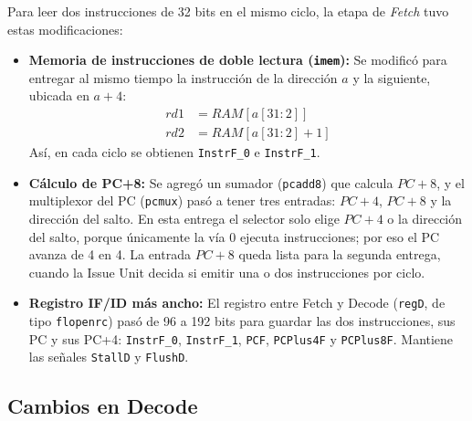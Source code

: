 \documentclass[12pt,a4paper]{article}
\begin{document}
Para leer dos instrucciones de 32 bits en el mismo ciclo, la etapa de \textit{Fetch} tuvo estas modificaciones:
\begin{itemize}
\item \textbf{Memoria de instrucciones de doble lectura (\texttt{imem}):} Se modificó para entregar al mismo tiempo la instrucción de la dirección $a$ y la siguiente, ubicada en $a+4$:
\begin{align}
rd1 &= RAM[a[31:2]] \\
rd2 &= RAM[a[31:2] + 1]
\end{align}
Así, en cada ciclo se obtienen \texttt{InstrF\_0} e \texttt{InstrF\_1}.

\item \textbf{Cálculo de PC+8:} Se agregó un sumador (\texttt{pcadd8}) que calcula $PC+8$, y el multiplexor del PC (\texttt{pcmux}) pasó a tener tres entradas: $PC+4$, $PC+8$ y la dirección del salto. En esta entrega el selector solo elige $PC+4$ o la dirección del salto, porque únicamente la vía 0 ejecuta instrucciones; por eso el PC avanza de 4 en 4. La entrada $PC+8$ queda lista para la segunda entrega, cuando la Issue Unit decida si emitir una o dos instrucciones por ciclo.

\item \textbf{Registro IF/ID más ancho:} El registro entre Fetch y Decode (\texttt{regD}, de tipo \texttt{flopenrc}) pasó de 96 a 192 bits para guardar las dos instrucciones, sus PC y sus PC+4: \texttt{InstrF\_0}, \texttt{InstrF\_1}, \texttt{PCF}, \texttt{PCPlus4F} y \texttt{PCPlus8F}. Mantiene las señales \texttt{StallD} y \texttt{FlushD}.
\end{itemize}

\subsection{Cambios en Decode}
\end{document}
